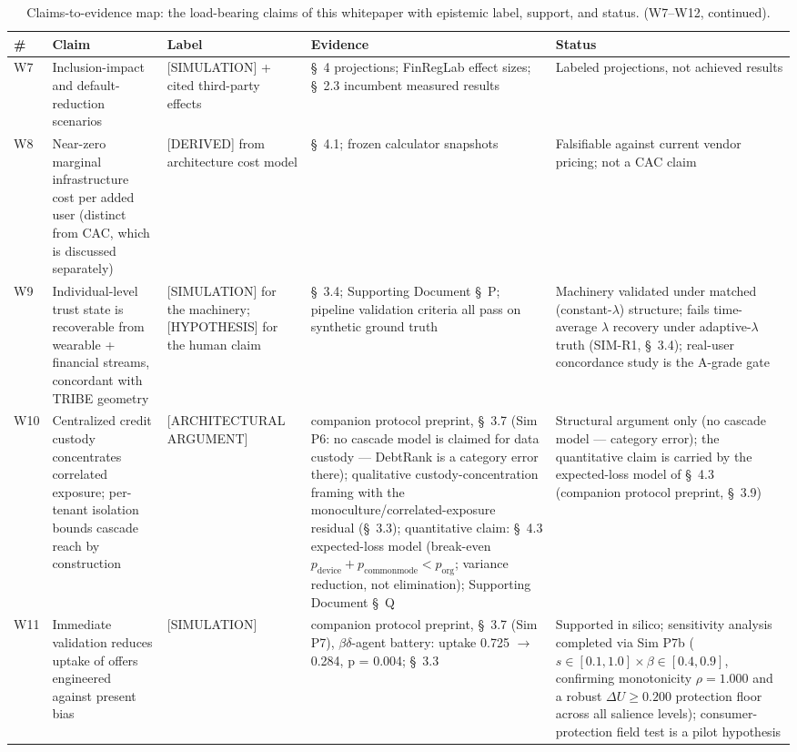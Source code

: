 \documentclass[11pt,twocolumn]{article}
\begin{document}
\begin{table}[t!]
\centering
\footnotesize
\caption{Claims-to-evidence map: the load-bearing claims of this whitepaper with epistemic label, support, and status. (W7--W12, continued).}\label{tab:claims-b}
\begin{tabular}{@{}p{} p{} p{} p{} p{}@{}}
\toprule
\# & Claim & Label & Evidence & Status \\
\midrule
W7 & Inclusion-impact and default-reduction scenarios & \hspace{0pt}[SIMULATION] + cited third-party effects & \S~4 projections; FinRegLab effect sizes; \S~2.3 incumbent measured results & Labeled projections, not achieved results \\
W8 & Near-zero marginal infrastructure cost per added user (distinct from CAC, which is discussed separately) & \hspace{0pt}[DERIVED] from architecture cost model & \S~4.1; frozen calculator snapshots & Falsifiable against current vendor pricing; not a CAC claim \\
W9 & Individual-level trust state is recoverable from wearable + financial streams, concordant with TRIBE geometry & \hspace{0pt}[SIMULATION] for the machinery; [HYPOTHESIS] for the human claim & \S~3.4; Supporting Document \S~P; pipeline validation criteria all pass on synthetic ground truth & Machinery validated under matched (constant-$\lambda$) structure; fails time-average $\lambda$ recovery under adaptive-$\lambda$ truth (SIM-R1, \S~3.4); real-user concordance study is the A-grade gate \\
W10 & Centralized credit custody concentrates correlated exposure; per-tenant isolation bounds cascade reach by construction & \hspace{0pt}[ARCHITECTURAL ARGUMENT] & companion protocol preprint, \S~3.7 (Sim P6: no cascade model is claimed for data custody --- DebtRank is a category error there); qualitative custody-concentration framing with the monoculture/correlated-exposure residual (\S~3.3); quantitative claim: \S~4.3 expected-loss model (break-even $p_{\mathrm{device}} + p_{\mathrm{commonmode}} < p_{\mathrm{org}}$; variance reduction, not elimination); Supporting Document \S~Q & Structural argument only (no cascade model --- category error); the quantitative claim is carried by the expected-loss model of \S~4.3 (companion protocol preprint, \S~3.9) \\
W11 & Immediate validation reduces uptake of offers engineered against present bias & \hspace{0pt}[SIMULATION] & companion protocol preprint, \S~3.7 (Sim P7), $\beta\delta$-agent battery: uptake 0.725 $\rightarrow$ 0.284, p = 0.004; \S~3.3 & Supported in silico; sensitivity analysis completed via Sim P7b ($s \in [0.1, 1.0] \times \beta \in [0.4, 0.9]$, confirming monotonicity $\rho = 1.000$ and a robust $\Delta U \ge 0.200$ protection floor across all salience levels); consumer-protection field test is a pilot hypothesis \\

\end{tabular}
\end{table}
\end{document}
